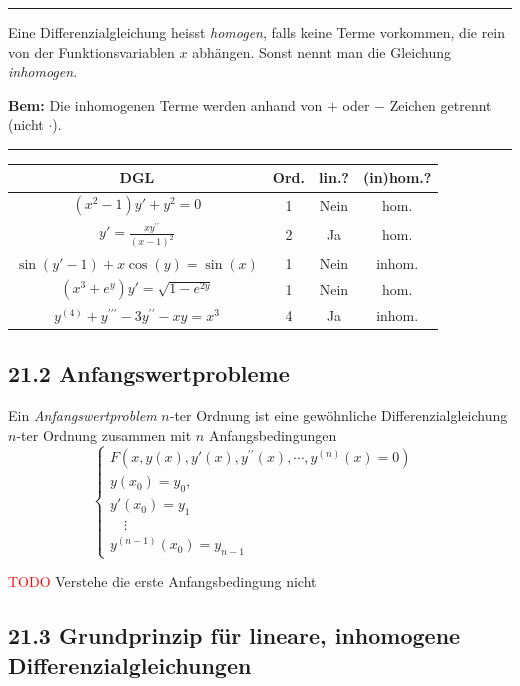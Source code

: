 \documentclass[a4paper,landscape,8pt]{extarticle}
\newcommand{\todo}{\textcolor{red}{TODO }}
\newcommand{\sep}{\vspace{5pt}\noindent\hrule\vspace{5pt}}
\newcommand{\Bem}{\textbf{Bem: }}
\begin{document}
\begin{multicols*}{4}
\begin{warmup}
\sep

\Def Eine Differenzialgleichung heisst \emph{homogen}, falls keine Terme
vorkommen, die rein von der Funktionsvariablen $x$ abhängen. Sonst nennt man die
Gleichung \emph{inhomogen}.

\Bem Die inhomogenen Terme werden anhand von $+$ oder $-$ Zeichen getrennt
(nicht $\cdot$).

\sep

\Bsp

\begin{tabular}{c c c c}
DGL & Ord. & lin.? & (in)hom.?\\
\toprule
$(x^2 -1)y' + y^2 = 0$ & 1 & Nein & hom.\\
$y'=\frac{xy^{\prime\prime}}{(x-1)^2}$ & 2 & Ja & hom.\\
$\sin(y'-1)+x\cos(y)=\sin(x)$ & 1 & Nein & inhom.\\
$(x^3+e^y)y' = \sqrt{1-e^{2y}}$ & 1 & Nein & hom.\\
$y^{(4)}+y^{\prime\prime\prime}-3y^{\prime\prime}-xy=x^3$ & 4 & Ja & inhom.\\
\bottomrule 
\end{tabular}

\end{warmup}

\subsection{21.2 Anfangswertprobleme}

\Def Ein \emph{Anfangswertproblem} $n$-ter Ordnung ist eine gewöhnliche
Differenzialgleichung $n$-ter Ordnung zusammen mit $n$ Anfangsbedingungen
\[
\begin{cases}
F(x,y(x),y'(x),y^{\prime\prime}(x), \cdots, y^{(n)}(x)=0) & \\
y(x_0) = y_0,\\
y'(x_0) = y_1\\
\quad \vdots\\
y^{(n-1)}(x_0) = y_{n-1}
\end{cases}
\]

\begin{warmup}
\todo{Verstehe die erste Anfangsbedingung nicht}
\end{warmup}

\subsection{21.3 Grundprinzip für lineare, inhomogene Differenzialgleichungen}


\end{multicols*}
\end{document}
